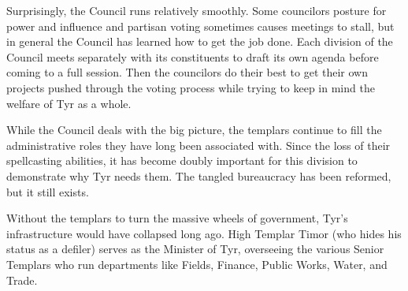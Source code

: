 {	Surprisingly, the Council runs relatively smoothly. Some councilors posture for power and influence and partisan voting sometimes causes meetings to stall, but in general the Council has learned how to get the job done. Each division of the Council meets separately with its constituents to draft its own agenda before coming to a full session. Then the councilors do their best to get their own projects pushed through the voting process while trying to keep in mind the welfare of Tyr as a whole.

	While the Council deals with the big picture, the templars continue to fill the administrative roles they have long been associated with. Since the loss of their spellcasting abilities, it has become doubly important for this division to demonstrate why Tyr needs them. The tangled bureaucracy has been reformed, but it still exists.

	Without the templars to turn the massive wheels of government, Tyr's infrastructure would have collapsed long ago. High Templar Timor (who hides his status as a defiler) serves as the Minister of Tyr, overseeing the various Senior Templars who run departments like Fields, Finance, Public Works, Water, and Trade.
}
